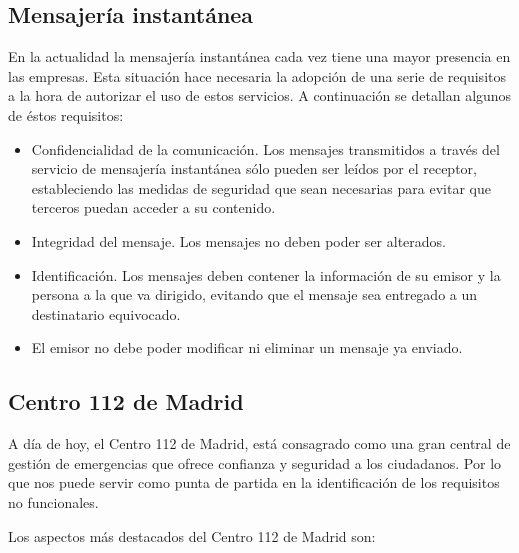 \subsection{Mensajería instantánea}

En la actualidad la mensajería instantánea cada vez tiene una mayor presencia en las empresas. Esta situación hace necesaria la adopción de una serie de requisitos a la hora de autorizar el uso de estos servicios. A continuación se detallan algunos de éstos requisitos:

\begin{itemize}
  \item Confidencialidad de la comunicación. Los mensajes transmitidos a través del servicio de mensajería instantánea sólo pueden ser leídos por el receptor, estableciendo las medidas de seguridad que sean necesarias para evitar que terceros puedan acceder a su contenido.
  \item Integridad del mensaje. Los mensajes no deben poder ser alterados.
  \item Identificación. Los mensajes deben contener la información de su emisor y la persona a la que va dirigido, evitando que el mensaje sea entregado a un destinatario equivocado.
  \item El emisor no debe poder modificar ni eliminar un mensaje ya enviado.
\end{itemize}

\subsection{Centro 112 de Madrid}

A día de hoy, el Centro 112 de Madrid, está consagrado como una gran central de gestión de emergencias que ofrece confianza y seguridad a los ciudadanos. Por lo que nos puede servir como punta de partida en la identificación de los requisitos no funcionales.

Los aspectos más destacados del Centro 112 de Madrid son:

